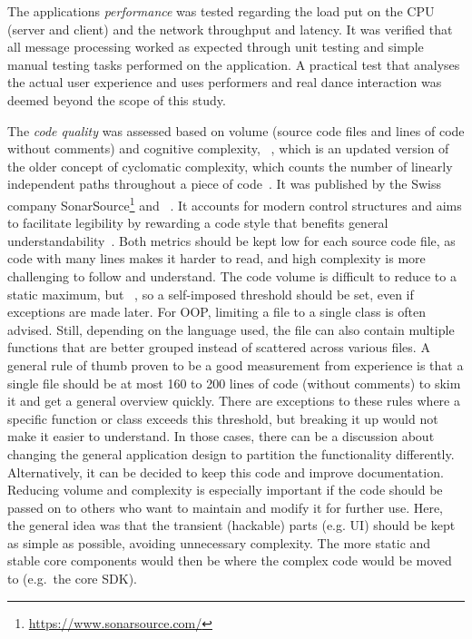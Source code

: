The application\textquotesingle s \emph{performance} was tested regarding the load put on the \ac{CPU} (server and client) and the network throughput and latency.
It was verified that all message processing worked as expected through unit testing and simple manual testing tasks performed on the application.
A practical test that analyses the actual user experience and uses performers and real dance interaction was deemed beyond the scope of this study.

The \emph{code quality} was assessed based on volume (source code files and lines of code without comments) and cognitive complexity, ~\parencite[see][]{sonarSourceCognitiveComplexity}, which is an updated version of the older concept of cyclomatic complexity, which counts the number of linearly independent paths throughout a piece of code~\parencite[see][]{mcCabeComplexity}.
It was published by the Swiss company SonarSource\footnote{\url{https://www.sonarsource.com/}} and ~\parencite[4]{sonarSourceCognitiveComplexity}.
It accounts for modern control structures and aims to facilitate legibility by rewarding a code style that benefits general understandability~\parencite[4]{sonarSourceCognitiveComplexity}.
Both metrics should be kept low for each source code file, as code with many lines makes it harder to read, and high complexity is more challenging to follow and understand.
The code volume is difficult to reduce to a static maximum, but ~\parencite[6]{softwareMetricsReliability}, so a self-imposed threshold should be set, even if exceptions are made later.
For \ac{OOP}, limiting a file to a single class is often advised.
Still, depending on the language used, the file can also contain multiple functions that are better grouped instead of scattered across various files.
A general rule of thumb proven to be a good measurement from experience is that a single file should be at most 160 to 200 lines of code (without comments) to skim it and get a general overview quickly.
There are exceptions to these rules where a specific function or class exceeds this threshold, but breaking it up would not make it easier to understand.
In those cases, there can be a discussion about changing the general application design to partition the functionality differently.
Alternatively, it can be decided to keep this code and improve documentation.
Reducing volume and complexity is especially important if the code should be passed on to others who want to maintain and modify it for further use.
Here, the general idea was that the transient (hackable) parts (e.g. \ac{UI}) should be kept as simple as possible, avoiding unnecessary complexity.
The more static and stable core components would then be where the complex code would be moved to (e.g.\ the core \ac{SDK}).


